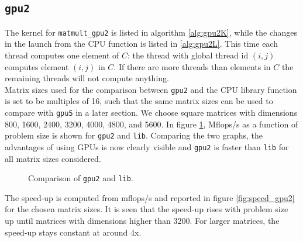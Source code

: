 \subsection{\texttt{gpu2}}
The kernel for \texttt{matmult\_gpu2} is listed in algorithm \ref{alg:gpu2K}, while the changes in the launch from the CPU function is listed in \ref{alg:gpu2L}. This time each thread computes one element of $C$: the thread with global thread id $(i,j)$ computes element $(i,j)$ in $C$. If there are more threads than elements in $C$ the remaining threads will not compute anything.\\




\noindent Matrix sizes used for the comparison between \texttt{gpu2} and the CPU library function is set to be multiples of 16, such that the same matrix sizes can be used to compare with \texttt{gpu5} in a later section. We choose square matrices with dimensions 800, 1600, 2400, 3200, 4000, 4800, and 5600. In figure \ref{fig:compare_gpu2}, Mflops/s as a function of problem size is shown for \texttt{gpu2} and \texttt{lib}. Comparing the two graphs, the advantages of using GPUs is now clearly visible and \texttt{gpu2} is faster than \texttt{lib} for all matrix sizes considered. \\
\begin{figure}[H]
\centering
{}
\caption{Comparison of \texttt{gpu2} and \texttt{lib}.}
\label{fig:compare_gpu2}
\end{figure}
\noindent The speed-up is computed from mflops/s and reported in figure \ref{fig:speed_gpu2} for the chosen matrix sizes. It is seen that the speed-up rises with problem size up until matrices with dimensions higher than 3200. For larger matrices, the speed-up stays constant at around 4x. 

